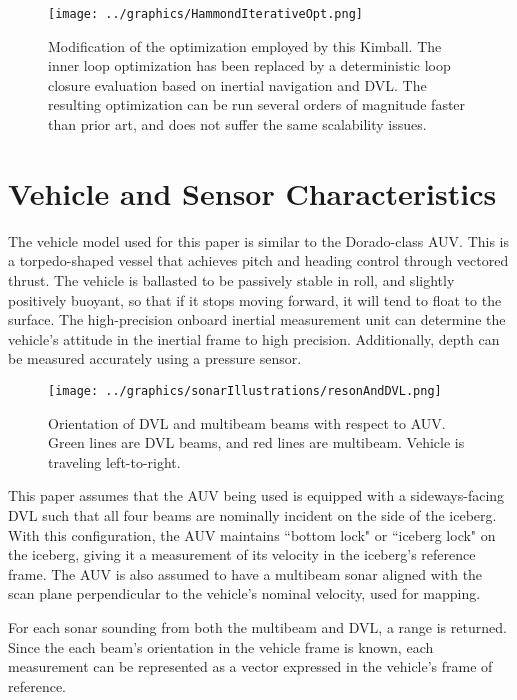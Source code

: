 \begin{figure}[htbp]
   \centering
   \texttt{[image: ../graphics/HammondIterativeOpt.png]} %
   \caption{Modification of the optimization employed by this Kimball. The inner loop optimization has been replaced by a deterministic loop closure evaluation based on inertial navigation and DVL. The resulting optimization can be run several orders of magnitude faster than prior art, and does not suffer the same scalability issues.}
   \label{fig:NestedLoop2}
\end{figure}

\section{Vehicle and Sensor Characteristics}
\label{sec.VehicleSetup}
The vehicle model used for this paper is similar to the Dorado-class AUV. This is a torpedo-shaped vessel that achieves pitch and heading control through vectored thrust. The vehicle is ballasted to be passively stable in roll, and slightly positively buoyant, so that if it stops moving forward, it will tend to float to the surface. The high-precision onboard inertial measurement unit can determine the vehicle's attitude in the inertial frame to high precision. Additionally, depth can be measured accurately using a pressure sensor. 

\begin{figure}[htbp]
   \centering
   \texttt{[image: ../graphics/sonarIllustrations/resonAndDVL.png]} %
   \caption{Orientation of DVL and multibeam beams with respect to AUV. Green lines are DVL beams, and red lines are multibeam. Vehicle is traveling left-to-right.}
   \label{fig:DVL}
\end{figure}


This paper assumes that the AUV being used is equipped with a sideways-facing DVL such that all four beams are nominally incident on the side of the iceberg. With this configuration, the AUV maintains ``bottom lock" or ``iceberg lock" on the iceberg, giving it a measurement of its velocity in the iceberg's reference frame. The AUV is also assumed to have a multibeam sonar aligned with the scan plane perpendicular to the vehicle's nominal velocity, used for mapping. 

For each sonar sounding from both the multibeam and DVL, a range is returned. Since the each beam's orientation in the vehicle frame is known, each measurement can be represented as a vector expressed in the vehicle's frame of reference.


